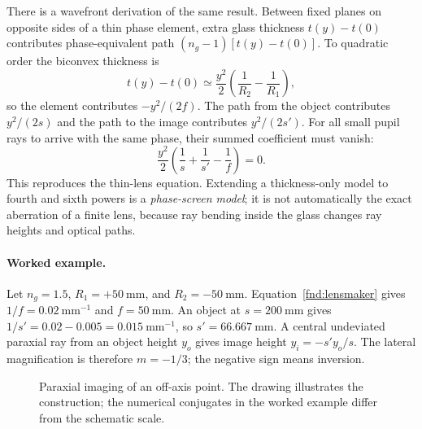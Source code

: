 There is a wavefront derivation of the same result. Between fixed planes on opposite sides of a thin phase element, extra glass thickness $t(y)-t(0)$ contributes phase-equivalent path $(n_g-1)[t(y)-t(0)]$. To quadratic order the biconvex thickness is
\[
t(y)-t(0)\simeq\frac{y^2}{2}\left(\frac{1}{R_2}-\frac{1}{R_1}\right),
\]
so the element contributes $-y^2/(2f)$. The path from the object contributes $y^2/(2s)$ and the path to the image contributes $y^2/(2s')$. For all small pupil rays to arrive with the same phase, their summed coefficient must vanish:
\[
\frac{y^2}{2}\left(\frac1s+\frac1{s'}-\frac1f\right)=0.
\]
This reproduces the thin-lens equation. Extending a thickness-only model to fourth and sixth powers is a \emph{phase-screen model}; it is not automatically the exact aberration of a finite lens, because ray bending inside the glass changes ray heights and optical paths.

\paragraph{Worked example.}
Let $n_g=1.5$, $R_1=+50\ \mathrm{mm}$, and $R_2=-50\ \mathrm{mm}$. Equation~\eqref{fnd:lensmaker} gives $1/f=0.02\ \mathrm{mm}^{-1}$ and $f=50\ \mathrm{mm}$. An object at $s=200\ \mathrm{mm}$ gives $1/s'=0.02-0.005=0.015\ \mathrm{mm}^{-1}$, so $s'=66.667\ \mathrm{mm}$. A central undeviated paraxial ray from an object height $y_o$ gives image height $y_i=-s'y_o/s$. The lateral magnification is therefore $m=-1/3$; the negative sign means inversion.

\begin{figure}[htbp]
\centering
{}
\caption{Paraxial imaging of an off-axis point. The drawing illustrates the construction; the numerical conjugates in the worked example differ from the schematic scale.}
\end{figure}

